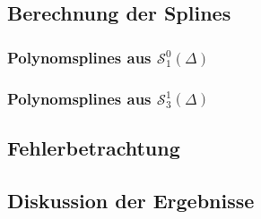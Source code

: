 \documentclass[ngerman,a4paper]{texmf/tex/latex/mathscript/mathscript}
\begin{document}
	\subsection{Berechnung der Splines}
	\subsubsection{Polynomsplines aus $\mathcal{S}_1^0(\Delta)$}
	
	\subsubsection{Polynomsplines aus $\mathcal{S}_3^1(\Delta)$}
	
	\subsection{Fehlerbetrachtung}
	
	\subsection{Diskussion der Ergebnisse}
\end{document}
